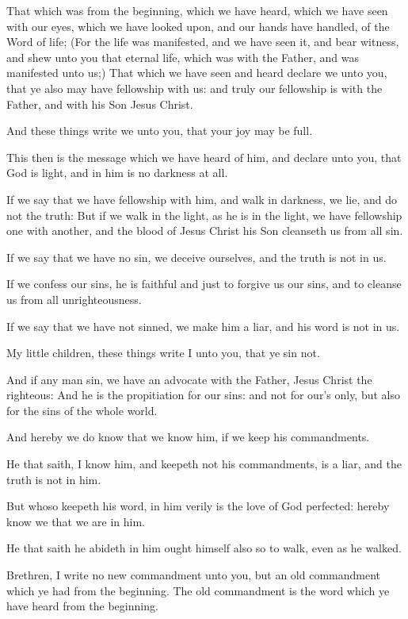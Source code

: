 \Chapter
\Verse That which was from the beginning, which we have heard, which we have seen with our eyes, which we have looked upon, and our hands have handled, of the Word of life; \Verse (For the life was manifested, and we have seen it, and bear witness, and shew unto you that eternal life, which was with the Father, and was manifested unto us;) \Verse That which we have seen and heard declare we unto you, that ye also may have fellowship with us: and truly our fellowship is with the Father, and with his Son Jesus Christ.

\Verse And these things write we unto you, that your joy may be full.

\Verse This then is the message which we have heard of him, and declare unto you, that God is light, and in him is no darkness at all.

\Verse If we say that we have fellowship with him, and walk in darkness, we lie, and do not the truth: \Verse But if we walk in the light, as he is in the light, we have fellowship one with another, and the blood of Jesus Christ his Son cleanseth us from all sin.

\Verse If we say that we have no sin, we deceive ourselves, and the truth is not in us.

\Verse If we confess our sins, he is faithful and just to forgive us our sins, and to cleanse us from all unrighteousness.

\Verse If we say that we have not sinned, we make him a liar, and his word is not in us.


\Chapter
\Verse My little children, these things write I unto you, that ye sin not.

And if any man sin, we have an advocate with the Father, Jesus Christ the righteous: \Verse And he is the propitiation for our sins: and not for our's only, but also for the sins of the whole world.

\Verse And hereby we do know that we know him, if we keep his commandments.

\Verse He that saith, I know him, and keepeth not his commandments, is a liar, and the truth is not in him.

\Verse But whoso keepeth his word, in him verily is the love of God perfected: hereby know we that we are in him.

\Verse He that saith he abideth in him ought himself also so to walk, even as he walked.

\Verse Brethren, I write no new commandment unto you, but an old commandment which ye had from the beginning. The old commandment is the word which ye have heard from the beginning.

